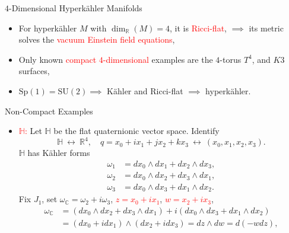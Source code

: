 \begin{frame}{$4$-Dimensional Hyperk\"ahler Manifolds}
    \begin{itemize}
        \item For hyperk\"ahler $M$ with $\dim_{\mathbb{R}}(M) = 4$, it is \textcolor{red}{Ricci-flat}, \break $\implies$ its metric solves the \textcolor{red}{vacuum Einstein field equations},
        \item Only known \textcolor{red}{compact $4$-dimensional} examples are the $4$-torus $T^{4}$, and $K3$ surfaces,
        \item $\text{Sp}(1) = \text{SU}(2) \implies$ K\"ahler and Ricci-flat $\implies$ hyperk\"ahler.
    \end{itemize}
\end{frame}

\begin{frame}{Non-Compact Examples}
    \begin{itemize}
        \item \textcolor{red}{$\mathbb{H}$:} Let $\mathbb{H}$ be the flat quaternionic vector space. Identify
        \[
            \mathbb{H}\ \longleftrightarrow\ \mathbb{R}^{4}, \quad q = x_{0} + ix_{1} + jx_{2} + kx_{3}\ \longleftrightarrow\ (x_{0}, x_{1}, x_{2}, x_{3}).
        \]
        $\mathbb{H}$ has K\"ahler forms
        \begin{align*}
            \omega_{1} &= dx_{0} \wedge dx_{1} + dx_{2} \wedge dx_{3}, \\
            \omega_{2} &= dx_{0} \wedge dx_{2} + dx_{3} \wedge dx_{1}, \\
            \omega_{3} &= dx_{0} \wedge dx_{3} + dx_{1} \wedge dx_{2}.
        \end{align*}
        Fix $J_{1}$, set $\omega_{\mathbb{C}} = \omega_{2} + i\omega_{3}$, \textcolor{red}{$z = x_{0} + ix_{1}$}, \textcolor{red}{$w = x_{2} + ix_{3}$},
        \begin{align*}
            \omega_{\mathbb{C}} &= (dx_{0} \wedge dx_{2} + dx_{3} \wedge dx_{1}) + i(dx_{0} \wedge dx_{3} + dx_{1} \wedge dx_{2}) \\
            &= (dx_{0} + idx_{1}) \wedge (dx_{2} + i dx_{3}) = dz \wedge dw = d(-wdz),
        \end{align*}
    \end{itemize}
\end{frame}

